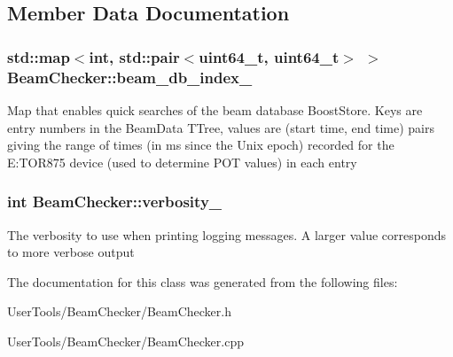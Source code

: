 \subsection{Member Data Documentation}
\hypertarget{classBeamChecker_aab9b16fbdd8cdea6aa1a77fc2f0ea842}{
\subsubsection[{beam\_\-db\_\-index\_\-}]{\setlength{\rightskip}{0pt plus 5cm}std::map$<$int, std::pair$<$uint64\_\-t, uint64\_\-t$>$ $>$ {\bf BeamChecker::beam\_\-db\_\-index\_\-}}}
\label{classBeamChecker_aab9b16fbdd8cdea6aa1a77fc2f0ea842}


Map that enables quick searches of the beam database BoostStore. Keys are entry numbers in the BeamData TTree, values are (start time, end time) pairs giving the range of times (in ms since the Unix epoch) recorded for the E:TOR875 device (used to determine POT values) in each entry \hypertarget{classBeamChecker_aceafb01556c2541a737d4feaab2f757e}{
\subsubsection[{verbosity\_\-}]{\setlength{\rightskip}{0pt plus 5cm}int {\bf BeamChecker::verbosity\_\-}}}
\label{classBeamChecker_aceafb01556c2541a737d4feaab2f757e}


The verbosity to use when printing logging messages. A larger value corresponds to more verbose output 

The documentation for this class was generated from the following files:\begin{DoxyCompactItemize}
\item 
UserTools/BeamChecker/BeamChecker.h\item 
UserTools/BeamChecker/BeamChecker.cpp\end{DoxyCompactItemize}
